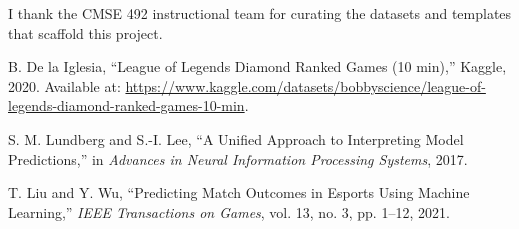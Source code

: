 \documentclass[aps,prl,preprint,groupedaddress]{revtex4-2}
\begin{document}
\begin{acknowledgments}
I thank the CMSE 492 instructional team for curating the datasets and templates that scaffold this project.
\end{acknowledgments}

\begin{thebibliography}{99}

B. De la Iglesia, ``League of Legends Diamond Ranked Games (10 min),'' Kaggle, 2020. Available at: \url{https://www.kaggle.com/datasets/bobbyscience/league-of-legends-diamond-ranked-games-10-min}.

S. M. Lundberg and S.-I. Lee, ``A Unified Approach to Interpreting Model Predictions,'' in \textit{Advances in Neural Information Processing Systems}, 2017.

T. Liu and Y. Wu, ``Predicting Match Outcomes in Esports Using Machine Learning,'' \textit{IEEE Transactions on Games}, vol. 13, no. 3, pp. 1--12, 2021.

\end{thebibliography}
\end{document}
